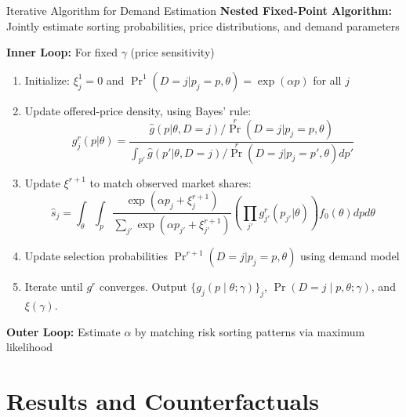 \documentclass[10pt,aspectratio=169]{beamer}
\begin{document}
\begin{frame}{Iterative Algorithm for Demand Estimation}
\small 
\textbf{Nested Fixed-Point Algorithm:} Jointly estimate sorting probabilities, price distributions, and demand parameters

\vspace{0.1cm}

\textbf{Inner Loop:} For fixed $\gamma$ (price sensitivity)

\begin{enumerate}
    \item Initialize: $\xi_j^1 = 0$ and $\Pr^1(D=j|p_j=p, \theta) = \exp(\alpha p)$ for all $j$
    
    \item Update offered-price density, using Bayes' rule: 
    {\small
    $$ g_j^r(p|\theta) = \frac{\hat{g}(p|\theta, D=j) / \Pr^r(D=j|p_j=p, \theta)}{\int_{p'} \hat{g}(p'|\theta, D=j) / \Pr^r(D=j|p_j=p', \theta)dp'} $$
    }
    
    \item Update $\xi^{r+1}$ to match observed market shares:
    {\small
    $$ \hat{s}_j = \int_\theta \int_p \frac{\exp(\alpha p_j + \xi_j^{r+1})}{\sum_{j'} \exp(\alpha p_{j'} + \xi_{j'}^{r+1})} \left(\prod_{j'} g_{j'}^r(p_{j'}|\theta)\right) f_0(\theta) dp d\theta $$
    }
    
    \item Update selection probabilities $\Pr^{r+1}(D=j|p_j=p, \theta)$ using demand model
    
    \item Iterate until $g^r$ converges. Output $\{g_j(p\mid\theta;\gamma)\}_j$, $\Pr(D=j\mid p,\theta;\gamma)$, and $\xi(\gamma)$.
\end{enumerate}

\vspace{0.2cm}

\textbf{Outer Loop:} Estimate $\alpha$ by matching risk sorting patterns via maximum likelihood

\end{frame}


\section{Results and Counterfactuals}
\end{document}
